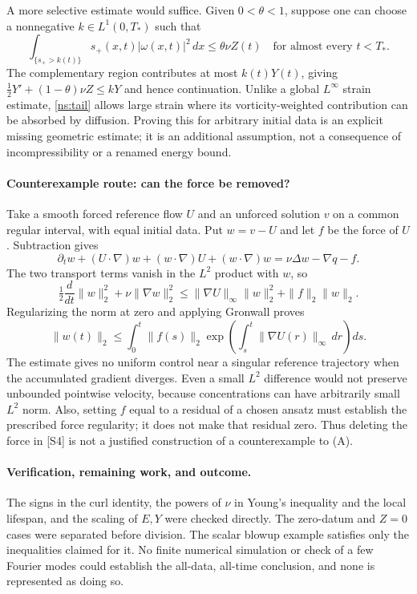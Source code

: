 \documentclass[11pt]{article}
\begin{document}
A more selective estimate would suffice. Given $0<\theta<1$, suppose one
 can choose a nonnegative $k\in L^1(0,T_*)$ such that
\begin{equation}\label{ns:tail}
 \int_{\{s_+>k(t)\}}s_+(x,t)|\omega(x,t)|^2\,dx
 \leq\theta\nu Z(t)
 \quad\text{for almost every }t<T_*.
\end{equation}
The complementary region contributes at most $k(t)Y(t)$, giving
 $\tfrac12Y'+(1-\theta)\nu Z\leq kY$ and hence continuation.
 Unlike a global $L^\infty$ strain estimate, \eqref{ns:tail} allows large
 strain where its vorticity-weighted contribution can be absorbed by
 diffusion. Proving this for arbitrary initial data is an explicit missing
 geometric estimate; it is an additional assumption, not a consequence of
 incompressibility or a renamed energy bound.

\paragraph{Counterexample route: can the force be removed?}
Take a smooth forced reference flow $U$ and an unforced solution $v$ on a
 common regular interval, with equal initial data. Put $w=v-U$ and let $f$
 be the force of $U$. Subtraction gives
\[
 \partial_tw+(U\cdot\nabla)w+(w\cdot\nabla)U+(w\cdot\nabla)w
 =\nu\Delta w-\nabla q-f.
\]
The two transport terms vanish in the $L^2$ product with $w$, so
\[
 \tfrac12\frac d{dt}\|w\|_2^2+\nu\|\nabla w\|_2^2
 \leq\|\nabla U\|_\infty\|w\|_2^2+\|f\|_2\|w\|_2.
\]
Regularizing the norm at zero and applying Gronwall proves
\begin{equation}\label{ns:force}
 \|w(t)\|_2\leq
 \int_0^t\|f(s)\|_2
 \exp\left(\int_s^t\|\nabla U(r)\|_\infty\,dr\right)ds.
\end{equation}
The estimate gives no uniform control near a singular reference trajectory
 when the accumulated gradient diverges. Even a small $L^2$ difference
 would not preserve unbounded pointwise velocity, because concentrations
 can have arbitrarily small $L^2$ norm. Also, setting $f$ equal to a residual
 of a chosen ansatz must establish the prescribed force regularity; it does
 not make that residual zero. Thus deleting the force in [S4] is not a
 justified construction of a counterexample to (A).

\paragraph{Verification, remaining work, and outcome.}
The signs in the curl identity, the powers of $\nu$ in Young's inequality
 and the local lifespan, and the scaling of $E,Y$ were checked directly.
 The zero-datum and $Z=0$ cases were separated before division. The scalar
 blowup example satisfies only the inequalities claimed for it. No finite
 numerical simulation or check of a few Fourier modes could establish the
 all-data, all-time conclusion, and none is represented as doing so.
\end{document}
